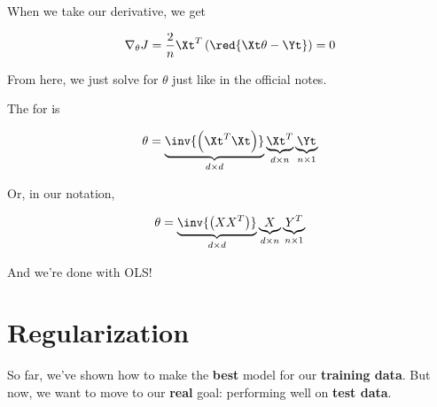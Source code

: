         When we take our derivative, we get
        
        \begin{equation}
            \nabla_\theta J = 
                \frac{2}{n} \Xt^T
                \left( \red{ \Xt \theta  - \Yt } \right) 
            =0
        \end{equation}
        
        From here, we just solve for $\theta$ just like in the official notes.\\
        
        \begin{kequation}
        
            The  for  is 
            
            \begin{equation*}
                \theta = 
                \underbrace{ 
                \inv{ \left(  \Xt^T\Xt  \right)  }
                }_{d \times d}
                \underbrace{
                \Xt^T
                }_{d \times n}
                \underbrace{
                \Yt
                }_{n \times 1} 
            \end{equation*}
            
            Or, in our  notation,
            
            \begin{equation*}
                \theta = 
                \underbrace{ 
                \inv{ \left(  XX^T  \right)  }
                }_{d \times d}
                \underbrace{
                X
                }_{d \times n}
                \underbrace{
                Y^T
                }_{n \times 1} 
            \end{equation*}
            
        \end{kequation}
        
    And we're done with OLS!

        
\pagebreak

\section{Regularization}
    
    So far, we've shown how to make the \textbf{best} model for our \textbf{training data}. But now, we want to move to our \textbf{real} goal: performing well on \textbf{test data}.
    
